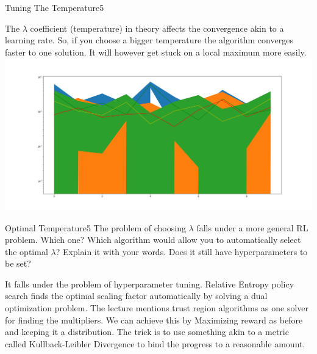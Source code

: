 \begin{questions}
\begin{question}{Tuning The Temperature}{5}
\begin{answer}
The $\lambda$ coefficient (temperature) in theory affects the convergence akin to a learning rate. So, if you choose a bigger temperature the algorithm converges faster to one solution. It will however get stuck on a local maximum more easily.
\includegraphics[width=174mm]{lambdas.png}
\end{answer}


\end{question}


\begin{question}[bonus]{Optimal Temperature}{5}
The problem of choosing $\lambda$ falls under a more general RL problem. Which one?
Which algorithm would allow you to automatically select the optimal $\lambda$? Explain it with your words.
Does it still have hyperparameters to be set?

\begin{answer}
It falls under the problem of hyperparameter tuning. Relative Entropy policy search finds the optimal scaling factor automatically by solving a dual optimization problem. The lecture mentions trust region algorithms as one solver for finding the multipliers. We can achieve this by Maximizing reward as before and keeping it a distribution. The trick is to use something akin to a metric called Kullback-Leibler Divergence to bind the progress to a reasonable amount.
\end{answer}


\end{question}


\end{questions}

